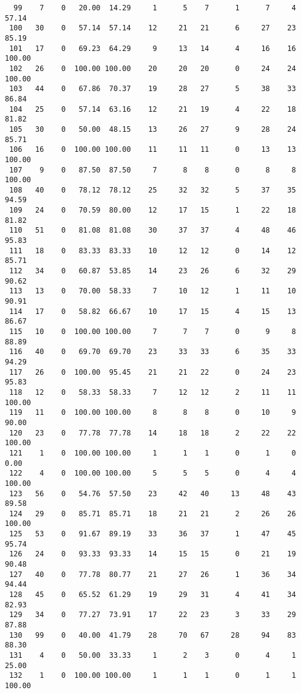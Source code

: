 \begin{verbatim}
  99    7    0   20.00  14.29     1      5    7      1      7     4    57.14
 100   30    0   57.14  57.14    12     21   21      6     27    23    85.19
 101   17    0   69.23  64.29     9     13   14      4     16    16   100.00
 102   26    0  100.00 100.00    20     20   20      0     24    24   100.00
 103   44    0   67.86  70.37    19     28   27      5     38    33    86.84
 104   25    0   57.14  63.16    12     21   19      4     22    18    81.82
 105   30    0   50.00  48.15    13     26   27      9     28    24    85.71
 106   16    0  100.00 100.00    11     11   11      0     13    13   100.00
 107    9    0   87.50  87.50     7      8    8      0      8     8   100.00
 108   40    0   78.12  78.12    25     32   32      5     37    35    94.59
 109   24    0   70.59  80.00    12     17   15      1     22    18    81.82
 110   51    0   81.08  81.08    30     37   37      4     48    46    95.83
 111   18    0   83.33  83.33    10     12   12      0     14    12    85.71
 112   34    0   60.87  53.85    14     23   26      6     32    29    90.62
 113   13    0   70.00  58.33     7     10   12      1     11    10    90.91
 114   17    0   58.82  66.67    10     17   15      4     15    13    86.67
 115   10    0  100.00 100.00     7      7    7      0      9     8    88.89
 116   40    0   69.70  69.70    23     33   33      6     35    33    94.29
 117   26    0  100.00  95.45    21     21   22      0     24    23    95.83
 118   12    0   58.33  58.33     7     12   12      2     11    11   100.00
 119   11    0  100.00 100.00     8      8    8      0     10     9    90.00
 120   23    0   77.78  77.78    14     18   18      2     22    22   100.00
 121    1    0  100.00 100.00     1      1    1      0      1     0     0.00
 122    4    0  100.00 100.00     5      5    5      0      4     4   100.00
 123   56    0   54.76  57.50    23     42   40     13     48    43    89.58
 124   29    0   85.71  85.71    18     21   21      2     26    26   100.00
 125   53    0   91.67  89.19    33     36   37      1     47    45    95.74
 126   24    0   93.33  93.33    14     15   15      0     21    19    90.48
 127   40    0   77.78  80.77    21     27   26      1     36    34    94.44
 128   45    0   65.52  61.29    19     29   31      4     41    34    82.93
 129   34    0   77.27  73.91    17     22   23      3     33    29    87.88
 130   99    0   40.00  41.79    28     70   67     28     94    83    88.30
 131    4    0   50.00  33.33     1      2    3      0      4     1    25.00
 132    1    0  100.00 100.00     1      1    1      0      1     1   100.00

\end{verbatim}
